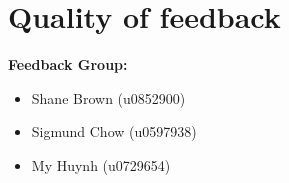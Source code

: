 \documentclass[11pt, a4paper]{article}
\begin{document}
\fi


\section{ Quality of feedback }

\textbf{Feedback Group:}
\begin{itemize}
\item Shane Brown (u0852900)
\item Sigmund Chow (u0597938)
\item My Huynh (u0729654)
\end{itemize}
\end{document}
